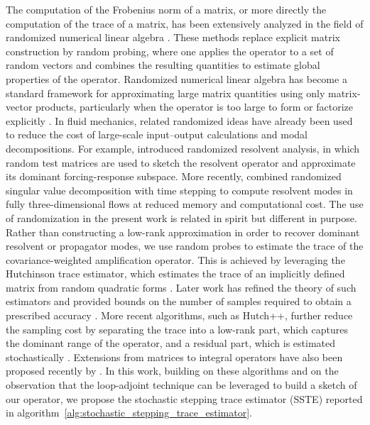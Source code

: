 The computation of the Frobenius norm of a matrix, or more directly the computation of the trace of a matrix, has been extensively analyzed in the field of randomized numerical linear algebra \citep{haim-sivan-2011}. These methods replace explicit matrix construction by random probing, where one applies the operator to a set of random vectors and combines the resulting quantities to estimate global properties of the operator. Randomized numerical linear algebra has become a standard framework for approximating large matrix quantities using only matrix-vector products, particularly when the operator is too large to form or factorize explicitly \citep{martinsson-tropp-2020}. In fluid mechanics, related randomized ideas have already been used to reduce the cost of large-scale input--output calculations and modal decompositions. For example, \citet{ribeiro-yeh-taira-2020} introduced randomized resolvent analysis, in which random test matrices are used to sketch the resolvent operator and approximate its dominant forcing-response subspace. More recently, \citet{farghadan-martini-towne-2025} combined randomized singular value decomposition with time stepping to compute resolvent modes in fully three-dimensional flows at reduced memory and computational cost. The use of randomization in the present work is related in spirit but different in purpose. Rather than constructing a low-rank approximation in order to recover dominant resolvent or propagator modes, we use random probes to estimate the trace of the covariance-weighted amplification operator. This is achieved by leveraging the Hutchinson trace estimator, which estimates the trace of an implicitly defined matrix from random quadratic forms \citep{hutchinson-1990}. Later work has refined the theory of such estimators and provided bounds on the number of samples required to obtain a prescribed accuracy \citep{khorasani-szekely-ascher-2015}. More recent algorithms, such as Hutch++, further reduce the sampling cost by separating the trace into a low-rank part, which captures the dominant range of the operator, and a residual part, which is estimated stochastically \citep{meyer-et-al-2020}. Extensions from matrices to integral operators have also been proposed recently by \citet{zvonek-horning-townsend-2025}. In this work, building on these algorithms and on the observation that the loop-adjoint technique can be leveraged to build a sketch of our operator, we propose the stochastic stepping trace estimator (SSTE) reported in algorithm~\ref{alg:stochastic_stepping_trace_estimator}.
